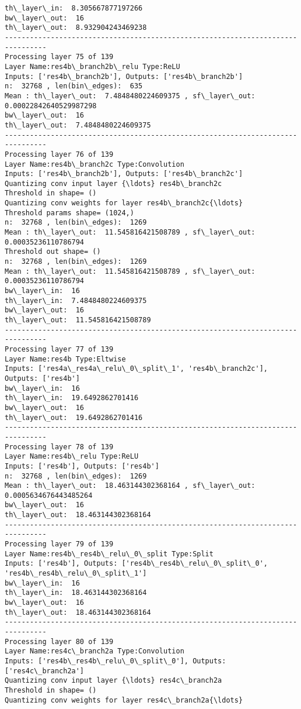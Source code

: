 \documentclass[11pt]{article}
\begin{document}
\begin{Verbatim}[commandchars=\\\{\}]
th\_layer\_in:  8.305667877197266
bw\_layer\_out:  16
th\_layer\_out:  8.932904243469238
--------------------------------------------------------------------------------
Processing layer 75 of 139
Layer Name:res4b\_branch2b\_relu Type:ReLU
Inputs: ['res4b\_branch2b'], Outputs: ['res4b\_branch2b']
n:  32768 , len(bin\_edges):  635
Mean : th\_layer\_out:  7.4848480224609375 , sf\_layer\_out:  0.00022842640529987298
bw\_layer\_out:  16
th\_layer\_out:  7.4848480224609375
--------------------------------------------------------------------------------
Processing layer 76 of 139
Layer Name:res4b\_branch2c Type:Convolution
Inputs: ['res4b\_branch2b'], Outputs: ['res4b\_branch2c']
Quantizing conv input layer {\ldots} res4b\_branch2c
Threshold in shape= ()
Quantizing conv weights for layer res4b\_branch2c{\ldots}
Threshold params shape= (1024,)
n:  32768 , len(bin\_edges):  1269
Mean : th\_layer\_out:  11.545816421508789 , sf\_layer\_out:  0.00035236110786794
Threshold out shape= ()
n:  32768 , len(bin\_edges):  1269
Mean : th\_layer\_out:  11.545816421508789 , sf\_layer\_out:  0.00035236110786794
bw\_layer\_in:  16
th\_layer\_in:  7.4848480224609375
bw\_layer\_out:  16
th\_layer\_out:  11.545816421508789
--------------------------------------------------------------------------------
Processing layer 77 of 139
Layer Name:res4b Type:Eltwise
Inputs: ['res4a\_res4a\_relu\_0\_split\_1', 'res4b\_branch2c'], Outputs: ['res4b']
bw\_layer\_in:  16
th\_layer\_in:  19.6492862701416
bw\_layer\_out:  16
th\_layer\_out:  19.6492862701416
--------------------------------------------------------------------------------
Processing layer 78 of 139
Layer Name:res4b\_relu Type:ReLU
Inputs: ['res4b'], Outputs: ['res4b']
n:  32768 , len(bin\_edges):  1269
Mean : th\_layer\_out:  18.463144302368164 , sf\_layer\_out:  0.0005634676443485264
bw\_layer\_out:  16
th\_layer\_out:  18.463144302368164
--------------------------------------------------------------------------------
Processing layer 79 of 139
Layer Name:res4b\_res4b\_relu\_0\_split Type:Split
Inputs: ['res4b'], Outputs: ['res4b\_res4b\_relu\_0\_split\_0', 'res4b\_res4b\_relu\_0\_split\_1']
bw\_layer\_in:  16
th\_layer\_in:  18.463144302368164
bw\_layer\_out:  16
th\_layer\_out:  18.463144302368164
--------------------------------------------------------------------------------
Processing layer 80 of 139
Layer Name:res4c\_branch2a Type:Convolution
Inputs: ['res4b\_res4b\_relu\_0\_split\_0'], Outputs: ['res4c\_branch2a']
Quantizing conv input layer {\ldots} res4c\_branch2a
Threshold in shape= ()
Quantizing conv weights for layer res4c\_branch2a{\ldots}

\end{Verbatim}
\end{document}
